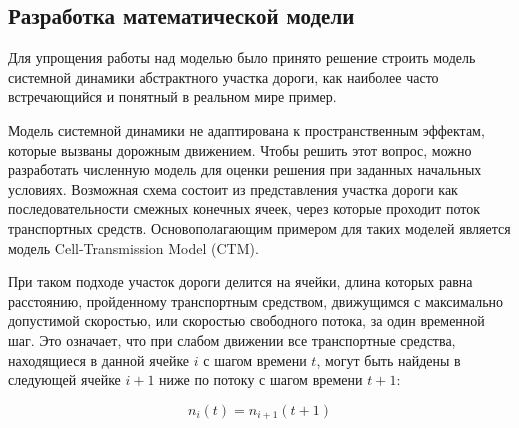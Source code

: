 \subsection{Разработка математической модели}

Для упрощения работы над моделью было принято решение строить модель системной динамики абстрактного участка дороги, как наиболее часто встречающийся и понятный в реальном мире пример. 


Модель системной динамики не адаптирована к пространственным эффектам, которые вызваны дорожным движением. Чтобы решить этот вопрос, можно разработать численную модель для оценки решения при заданных начальных условиях. Возможная схема состоит из представления участка дороги как последовательности смежных конечных ячеек, через которые проходит поток транспортных средств. Основополагающим примером для таких моделей является модель Cell-Transmission Model (CTM).


При таком подходе участок дороги делится на ячейки, длина которых равна расстоянию, пройденному транспортным средством, движущимся с максимально допустимой скоростью, или скоростью свободного потока, за один временной шаг. Это означает, что при слабом движении все транспортные средства, находящиеся в данной ячейке $i$ с шагом времени $t$, могут быть найдены в следующей ячейке $i+1$ ниже по потоку с шагом времени $t+1$:

\begin{equation}
    n_i(t) = n_{i+1}(t+1)
\end{equation}



